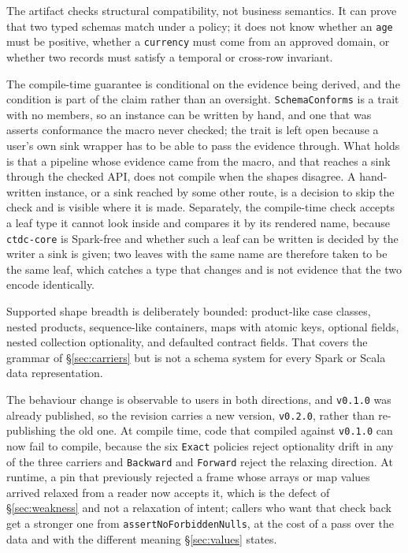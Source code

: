 The artifact checks structural compatibility, not business semantics. It can prove that two typed schemas match under a policy; it does not know whether an \texttt{age} must be positive, whether a \texttt{currency} must come from an approved domain, or whether two records must satisfy a temporal or cross-row invariant.

The compile-time guarantee is conditional on the evidence being derived, and the condition is part of the claim rather than an oversight. \texttt{SchemaConforms} is a trait with no members, so an instance can be written by hand, and one that was asserts conformance the macro never checked; the trait is left open because a user's own sink wrapper has to be able to pass the evidence through. What holds is that a pipeline whose evidence came from the macro, and that reaches a sink through the checked API, does not compile when the shapes disagree. A hand-written instance, or a sink reached by some other route, is a decision to skip the check and is visible where it is made. Separately, the compile-time check accepts a leaf type it cannot look inside and compares it by its rendered name, because \texttt{ctdc-core} is Spark-free and whether such a leaf can be written is decided by the writer a sink is given; two leaves with the same name are therefore taken to be the same leaf, which catches a type that changes and is not evidence that the two encode identically.

Supported shape breadth is deliberately bounded: product-like case classes, nested products, sequence-like containers, maps with atomic keys, optional fields, nested collection optionality, and defaulted contract fields. That covers the grammar of \S\ref{sec:carriers} but is not a schema system for every Spark or Scala data representation.

The behaviour change is observable to users in both directions, and \texttt{v0.1.0} was already published, so the revision carries a new version, \texttt{v0.2.0}, rather than re-publishing the old one. At compile time, code that compiled against \texttt{v0.1.0} can now fail to compile, because the six \texttt{Exact} policies reject optionality drift in any of the three carriers and \texttt{Backward} and \texttt{Forward} reject the relaxing direction. At runtime, a pin that previously rejected a frame whose arrays or map values arrived relaxed from a reader now accepts it, which is the defect of \S\ref{sec:weakness} and not a relaxation of intent; callers who want that check back get a stronger one from \texttt{assertNoForbiddenNulls}, at the cost of a pass over the data and with the different meaning \S\ref{sec:values} states.


